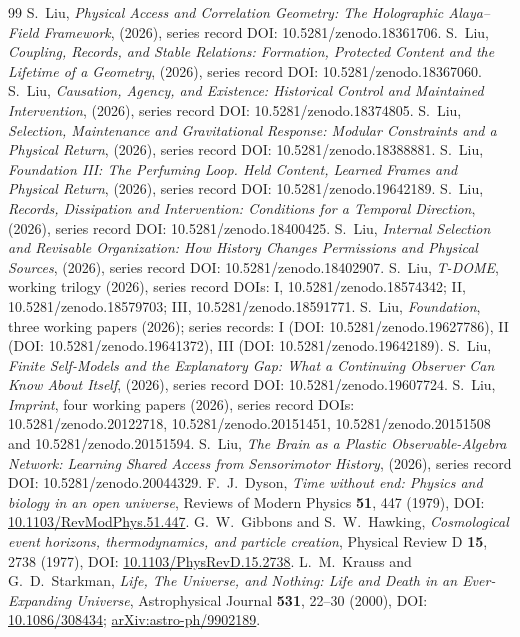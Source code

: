 \documentclass[12pt,a4paper]{article}
\begin{document}
\begin{thebibliography}{99}
\small
{}
S.~Liu, \emph{Physical Access and Correlation Geometry: The Holographic Alaya--Field Framework}, (2026), series record DOI: 10.5281/zenodo.18361706.
S.~Liu, \emph{Coupling, Records, and Stable Relations: Formation, Protected Content and the Lifetime of a Geometry}, (2026), series record DOI: 10.5281/zenodo.18367060.
S.~Liu, \emph{Causation, Agency, and Existence: Historical Control and Maintained Intervention}, (2026), series record DOI: 10.5281/zenodo.18374805.
S.~Liu, \emph{Selection, Maintenance and Gravitational Response: Modular Constraints and a Physical Return}, (2026), series record DOI: 10.5281/zenodo.18388881.
S.~Liu, \emph{Foundation III: The Perfuming Loop. Held Content, Learned Frames and Physical Return}, (2026), series record DOI: 10.5281/zenodo.19642189.
S.~Liu, \emph{Records, Dissipation and Intervention: Conditions for a Temporal Direction}, (2026), series record DOI: 10.5281/zenodo.18400425.
S.~Liu, \emph{Internal Selection and Revisable Organization: How History Changes Permissions and Physical Sources}, (2026), series record DOI: 10.5281/zenodo.18402907.
S.~Liu, \emph{T-DOME}, working trilogy (2026), series record DOIs: I, 10.5281/zenodo.18574342; II, 10.5281/zenodo.18579703; III, 10.5281/zenodo.18591771.
S.~Liu, \emph{Foundation}, three working papers (2026); series records: I (DOI: 10.5281/zenodo.19627786), II (DOI: 10.5281/zenodo.19641372), III (DOI: 10.5281/zenodo.19642189).
S.~Liu, \emph{Finite Self-Models and the Explanatory Gap: What a Continuing Observer Can Know About Itself}, (2026), series record DOI: 10.5281/zenodo.19607724.
S.~Liu, \emph{Imprint}, four working papers (2026), series record DOIs: 10.5281/zenodo.20122718, 10.5281/zenodo.20151451, 10.5281/zenodo.20151508 and 10.5281/zenodo.20151594.
S.~Liu, \emph{The Brain as a Plastic Observable-Algebra Network: Learning Shared Access from Sensorimotor History}, (2026), series record DOI: 10.5281/zenodo.20044329.
F.~J.~Dyson, \emph{Time without end: Physics and biology in an open universe}, Reviews of Modern Physics \textbf{51}, 447 (1979), DOI: \href{https://doi.org/10.1103/RevModPhys.51.447}{10.1103/RevModPhys.51.447}.
G.~W.~Gibbons and S.~W.~Hawking, \emph{Cosmological event horizons, thermodynamics, and particle creation}, Physical Review D \textbf{15}, 2738 (1977), DOI: \href{https://doi.org/10.1103/PhysRevD.15.2738}{10.1103/PhysRevD.15.2738}.
L.~M.~Krauss and G.~D.~Starkman, \emph{Life, The Universe, and Nothing: Life and Death in an Ever-Expanding Universe}, Astrophysical Journal \textbf{531}, 22--30 (2000), DOI: \href{https://doi.org/10.1086/308434}{10.1086/308434}; \href{https://arxiv.org/abs/astro-ph/9902189}{arXiv:astro-ph/9902189}.
\end{thebibliography}
\end{document}

